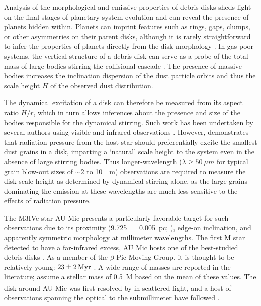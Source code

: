 \documentclass[modern]{aastex62}
\begin{document}
Analysis of the morphological and emissive properties of debris disks sheds light on the final stages of planetary system evolution and can reveal the presence of planets hidden within.
Planets can imprint features such as rings, gaps, clumps, or other asymmetries on their parent disks, although it is rarely straightforward to infer the properties of planets directly from the disk morphology \citep[see the review by][and references therein]{hughes18}.
In gas-poor systems, the vertical structure of a debris disk can serve as a probe of the total mass of large bodies stirring the collisional cascade \citep{thebault09}.
The presence of massive bodies increases the inclination dispersion of the dust particle orbits and thus the scale height $H$ of the observed dust distribution.

The dynamical excitation of a disk can therefore be measured from its aspect ratio $H/r$, which in turn allows inferences about the presence and size of the bodies responsible for the dynamical stirring.
Such work has been undertaken by several authors using visible and infrared observations \citep{artymowicz97,thebault&augereau07,quillen07}.
However, \citet{thebault09} demonstrates that radiation pressure from the host star should preferentially excite the smallest dust grains in a disk, imparting a `natural' scale height to the system even in the absence of large stirring bodies. 
Thus longer-wavelength ($\lambda \geq \SI{50}{\mu m}$ for typical grain blow-out sizes of $\sim 2$ to \SI{10}{\mu m}) observations are required to measure the disk scale height as determined by dynamical stirring alone, as the large grains dominating the emission at these wavelengths are much less sensitive to the effects of radiation pressure.

The M3IVe star AU Mic presents a particularly favorable target for such observations due to its proximity (\SI{9.725 \pm 0.005}{pc}; \citealp{gaia16,gaia_DR2}), edge-on inclination, and apparently symmetric morphology at millimeter wavelengths.
The first M star detected to have a far-infrared excess, AU Mic hosts one of the best-studied debris disks \citep{moshir90}. 
As a member of the $\beta$ Pic Moving Group, it is thought to be relatively young: $\SI{23 \pm 2}{Myr}$ \citep{binks&jeffries14,mamajek&bell14,malo14}. 
A wide range of masses \citep[\SIrange{0.3}{0.6}{M_\sun};][]{plavchan09,houdebine&doyle94} are reported in the literature; \citet{schuppler17} assume a stellar mass of \SI{0.5}{M_\sun} based on the mean of these values.
The disk around AU Mic was first resolved by \citet{kalas04} in scattered light, and a host of observations spanning the optical to the submillimeter have followed \citep{augereau&beust06,macgregor13,schneider14,matthews15,wang15}. 
\end{document}
